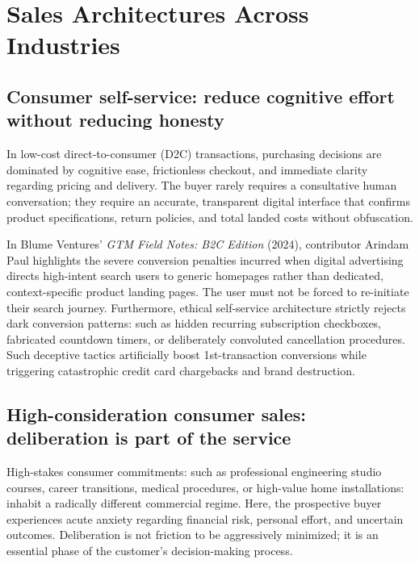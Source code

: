 \section{Sales Architectures Across Industries}

\subsection{Consumer self-service: reduce cognitive effort without reducing honesty}

In low-cost direct-to-consumer (D2C) transactions, purchasing decisions are dominated by cognitive ease, frictionless checkout, and immediate clarity regarding pricing and delivery. The buyer rarely requires a consultative human conversation; they require an accurate, transparent digital interface that confirms product specifications, return policies, and total landed costs without obfuscation.

In Blume Ventures' \textit{GTM Field Notes: B2C Edition} (2024), contributor Arindam Paul highlights the severe conversion penalties incurred when digital advertising directs high-intent search users to generic homepages rather than dedicated, context-specific product landing pages. The user must not be forced to re-initiate their search journey. Furthermore, ethical self-service architecture strictly rejects dark conversion patterns: such as hidden recurring subscription checkboxes, fabricated countdown timers, or deliberately convoluted cancellation procedures. Such deceptive tactics artificially boost 1st-transaction conversions while triggering catastrophic credit card chargebacks and brand destruction.

\subsection{High-consideration consumer sales: deliberation is part of the service}

High-stakes consumer commitments: such as professional engineering studio courses, career transitions, medical procedures, or high-value home installations: inhabit a radically different commercial regime. Here, the prospective buyer experiences acute anxiety regarding financial risk, personal effort, and uncertain outcomes. Deliberation is not friction to be aggressively minimized; it is an essential phase of the customer's decision-making process.

